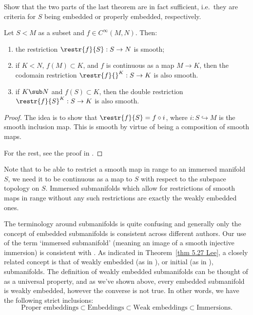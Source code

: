 \begin{xca}
Show that the two parts of the last theorem are in fact sufficient, i.e.\ they are criteria for $S$ being embedded or properly embedded, respectively.
\end{xca}

\begin{thm}\label{thm 5.27 Lee}\label{thm restrictions to submfds}
Let $S< M$ as a subset and $f\in C^\infty(M,N)$. Then:
\begin{enumerate}
    \item the restriction $\restr{f}{S}:S\to N$ is smooth;
    \item if $K<N$, $f(M)\subset K$, and $f$ is continuous as a map $M\to K$, then the codomain restriction $\restr{f}{}^{K}:S\to K$ is also smooth.
    \item if $K\sub N$ and $f(S)\subset K$, then the double restriction $\restr{f}{S}^{K}:S\to K$ is also smooth.
\end{enumerate}
\end{thm}
\begin{proof}
The idea is to show that $\restr{f}{S}=f\circ i$, where $i:S\hookrightarrow M$ is the smooth inclusion map. This is smooth by virtue of being a composition of smooth maps.

For the rest, see the proof in \cite[Thms.~5.27-30]{Lee}.
\end{proof}

Note that to be able to restrict a smooth map in range to an immersed manifold $S$, we need it to be continuous as a map to $S$ with respect to the subspace topology on $S$. Immersed submanifolds which allow for restrictions of smooth maps in range without any such restrictions are exactly the weakly embedded ones.

\begin{rem}
    The terminology around submanifolds is quite confusing and generally only the concept of embedded submanifolds is consistent across different authors. Our use of the term `immersed submanifold' (meaning an image of a smooth injective immersion) is consistent with \cite{Lee}. As indicated in Theorem~\ref{thm 5.27 Lee}, a closely related concept is that of weakly embedded (as in \cite{Lee}), or initial (as in \cite{RS1}), submanifolds. The definition of weakly embedded submanifolds can be thought of as a universal property, and as we've shown above, every embedded submanifold is weakly embedded, however the converse is not true. In other words, we have the following strict inclusions:
    \[\text{Proper embeddings}\subset \text{Embeddings}\subset\text{Weak embeddings}\subset\text{Immersions}.\]
\end{rem}

